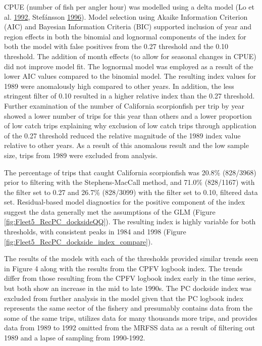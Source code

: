 \documentclass[12pt,]{article}
\begin{document}
CPUE (number of fish per angler hour) was modelled using a delta model
(Lo et al. \protect\hyperlink{ref-Lo1992}{1992}, Stefánsson
\protect\hyperlink{ref-Stefansson1996}{1996}). Model selection using
Akaike Information Criterion (AIC) and Bayesian Information Criteria
(BIC) supported inclusion of year and region effects in both the
binomial and lognormal components of the index for both the model with
false positives from the 0.27 threshold and the 0.10 threshold. The
addition of month effects (to allow for seasonal changes in CPUE) did
not improve model fit. The lognormal model was employed as a result of
the lower AIC values compared to the binomial model. The resulting index
values for 1989 were anomalously high compared to other years. In
addition, the less stringent filter of 0.10 resulted in a higher
relative index than the 0.27 threshold. Further examination of the
number of California scorpionfish per trip by year showed a lower number
of trips for this year than others and a lower proportion of low catch
trips explaining why exclusion of low catch trips through application of
the 0.27 threshold reduced the relative magnitude of the 1989 index
value relative to other years. As a result of this anomalous result and
the low sample size, trips from 1989 were excluded from analysis.

The percentage of trips that caught California scorpionfish was 20.8\%
(828/3968) prior to filtering with the Stephens-MacCall method, and
71.0\% (828/1167) with the filter set to 0.27 and 26.7\% (828/3099) with
the filter set to 0.10, filtered data set. Residual-based model
diagnostics for the positive component of the index suggest the data
generally met the assumptions of the GLM (Figure
\ref{fig:Fleet5_RecPC_docksideQQ}). The resulting index is highly
variable for both thresholds, with consistent peaks in 1984 and 1998
(Figure \ref{fig:Fleet5_RecPC_dockside_index_compare}).

The results of the models with each of the thresholds provided similar
trends seen in Figure 4 along with the results from the CPFV logbook
index. The trends differ from those resulting from the CPFV logbook
index early in the time series, but both show an increase in the mid to
late 1990s. The PC dockside index was excluded from further analysis in
the model given that the PC logbook index represents the same sector of
the fishery and presumably contains data from the some of the same
trips, utilizes data for many thousands more trips, and provides data
from 1989 to 1992 omitted from the MRFSS data as a result of filtering
out 1989 and a lapse of sampling from 1990-1992.
\end{document}
